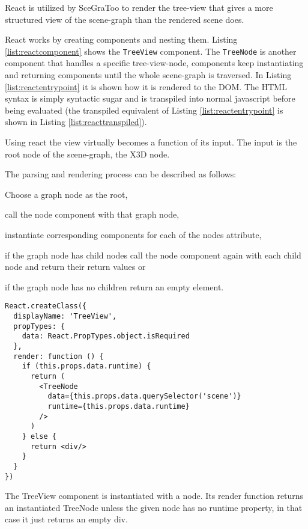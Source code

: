 React is utilized by \gls{SceGraToo} to render the tree-view that gives a more
structured view of the scene-graph than the rendered scene does.

React works by creating components and nesting them. Listing
\ref{list:reactcomponent} shows the \texttt{TreeView} component. The
\texttt{TreeNode} is another component that handles a specific tree-view-node,
components keep instantiating and returning components until the whole
scene-graph is traversed. In Listing \ref{list:reactentrypoint} it is shown how
it is rendered to the \gls{DOM}. The \gls{HTML} syntax is simply syntactic sugar and is
transpiled into normal javascript before being evaluated (the transpiled
equivalent of Listing \ref{list:reactentrypoint} is shown in Listing
\ref{list:reacttranspiled}).

Using react the view virtually becomes a function of its input. The input is the root node of the scene-graph, the \gls{X3D} node.

The parsing and rendering process can be described as follows:
\begin{enumerate*}
  \item Choose a graph node as the root,
  \item call the node component with that graph node,
  \item instantiate corresponding components for each of the nodes attribute,
  \item if the graph node has child nodes call the node component again with each child node and return their return values or
  \item if the graph node has no children return an empty element.
\end{enumerate*}

\begin{listing}
  \begin{verbatim}
React.createClass({
  displayName: 'TreeView',
  propTypes: {
    data: React.PropTypes.object.isRequired
  },
  render: function () {
    if (this.props.data.runtime) {
      return (
        <TreeNode
          data={this.props.data.querySelector('scene')}
          runtime={this.props.data.runtime}
        />
      )
    } else {
      return <div/>
    }
  }
})
  \end{verbatim}
  \caption{The TreeView component is instantiated with a node. Its render function returns an instantiated TreeNode unless the given node has no runtime property, in that case it just returns an empty div.}
  \label{list:reactcomponent}
\end{listing}

